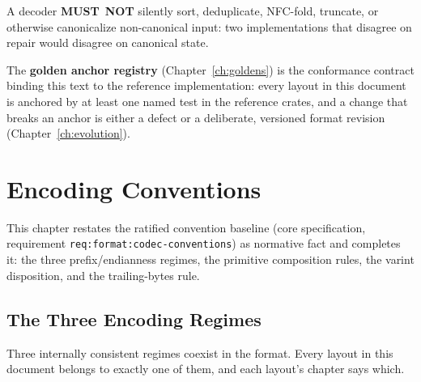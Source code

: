 \documentclass[11pt,letterpaper]{report}
\newcounter{requirement}[chapter]
\newcommand{\MUSTNOT}{\textbf{MUST}\nobreak\ \textbf{NOT}}
\begin{document}
A decoder \MUSTNOT{} silently sort, deduplicate, NFC-fold, truncate, or
otherwise canonicalize non-canonical input: two implementations that disagree
on repair would disagree on canonical state.

The \textbf{golden anchor registry} (Chapter~\ref{ch:goldens}) is the
conformance contract binding this text to the reference implementation: every
layout in this document is anchored by at least one named test in the
reference crates, and a change that breaks an anchor is either a defect or a
deliberate, versioned format revision (Chapter~\ref{ch:evolution}).

\chapter{Encoding Conventions}
\label{ch:conventions}

This chapter restates the ratified convention baseline (core specification,
requirement \texttt{req:format:codec-conventions}) as normative fact and
completes it: the three prefix/endianness regimes, the primitive composition
rules, the varint disposition, and the trailing-bytes rule.

\section{The Three Encoding Regimes}
\label{sec:conventions:regimes}

Three internally consistent regimes coexist in the format. Every layout in
this document belongs to exactly one of them, and each layout's chapter says
which.
\end{document}
